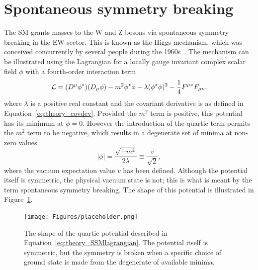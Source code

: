 \section{Spontaneous symmetry breaking}

The SM grants masses to the W and Z bosons via spontaneous symmetry breaking 
in the EW sector.
This is known as the Higgs mechanism, 
which was conceived concurrently by several people 
during the 1960s~\cite{HiggsPaper,BroutEnglert,KibbleEtc}.
The mechanism can be illustrated using the Lagrangian 
for a locally gauge invariant complex scalar field $\phi$ 
with a fourth-order interaction term~\cite{Thomson}
\begin{equation}
\label{eq:theory_SSMlagrangian}
\mathcal{L} = (D^\mu \phi^*) (D_\mu \phi) - m^2 \phi^*\phi 
        - \lambda (\phi^*\phi)^2 - \frac{1}{4} F^{\mu\nu}F_{\mu\nu} ,
\end{equation}
where $\lambda$ is a positive real constant %
and the covariant derivative is as defined in Equation~\ref{eq:theory_covdev}.
Provided the $m^2$ term is positive, this potential has its minimum at $\phi=0$.
However the introduction of the quartic term permits the $m^2$ term to be negative, 
which results in a degenerate set of minima at non-zero values
\begin{equation}
|\phi| = \frac{\sqrt{-m^2}}{2\lambda} \equiv \frac{v}{\sqrt{2}} ,
\end{equation}
where the vacuum expectation value $v$ has been defined.
Although the potential itself is symmetric, the physical vacuum state is not;
this is what is meant by the term spontaneous symmetry breaking.
The shape of this potential is illustrated in Figure~\ref{fig:theory_SSB}.

\begin{figure}[hptb]
  \centering
  \texttt{[image: Figures/placeholder.png]}
  \caption[Quartic potential exhibiting spontaneous symmetry breaking.]
  {
    The shape of the quartic potential described in Equation~\ref{eq:theory_SSMlagrangian}.
    The potential itself is symmetric, 
    but the symmetry is broken when a specific choice of ground state is made 
    from the degenerate of available minima.
  }
  \label{fig:theory_SSB}
\end{figure}

